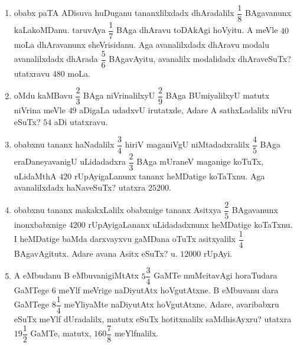 \begin{enumerate}[\rm(1)]
\item obabx paTA ADisuva huDuganu tananxlilxdadx dhAradalilx $\dfrac{1}{8}$ BAgavanunx kaLakoMDanu. taruvAya $\dfrac{1}{7}$ BAga \hbox{dhAravu} toDAkAgi hoVyitu. A meVle $40$ moLa dhAravanunx sheVrisidanu. Aga avanalilxdadx dhAravu modalu avanalilxdadx dhArada $\dfrac{5}{6}$ BAgavAyitu, avanalilx modalidadx dhAraveSuTx? \hfill utatxravu $480$ moLa.

\item oMdu kaMBavu $\dfrac{2}{3}$ BAga niVrinalilxyU $\dfrac{2}{9}$ BAga BUmiyalilxyU matutx niVrina meVle $49$ aDigaLa udadxvU irutatxde, Adare A sathxLadalilx niVru eSuTx? \hfill $54$ aDi utatxravu.

\item obabxnu tananx haNadalilx $\dfrac{3}{4}$ hiriV maganiVgU niMtadadxralilx $\dfrac{4}{5}$ BAga eraDaneyavanigU uLidadadxra $\dfrac{2}{3}$ BAga mUraneV maganige koTuTx, uLidaMthA $420$ rUpAyigaLanunx tananx heMDatige koTaTxnu. Aga avanalilxdadx haNaveSuTx? \hfill utatxra $25200.$

\item obabxnu tananx makakxLalilx obabxnige tananx Asitxya $\dfrac{2}{5}$ BAgavanunx inonxbabxnige $4200$ rUpAyigaLananx uLi\-dadadxnunx heMDatige koTaTxnu. I heMDatige baMda darxvayxvu gaMDana oTuTx asitxyalilx $\dfrac{1}{4}$ BAgavAgitutx. Adare avana Asitx eSuTx? \hfill u. $12000$ rUpAyi.

\item {\rm A} eMbudanu {\rm B} eMbuvanigiMtAtx $5\dfrac{3}{4}$ GaMTe muMcitavAgi horaTudara GaMTege $6$ meYlf meVrige naDiyutAtx hoVgutAtxne. {\rm B} eMbuvanu dara GaMTege $8\dfrac{1}{4}$ meYliyaMte naDiyutAtx hoVgutAtxne. Adare, avaribabxru eSuTx meYlf dUradalilx, matutx eSuTx hotitxnalilx saMdhisAyxru? \hfill utatxra $19\dfrac{1}{2}$ GaMTe, matutx, $160\dfrac{7}{8}$ meYlfnalilx.
\end{enumerate}


